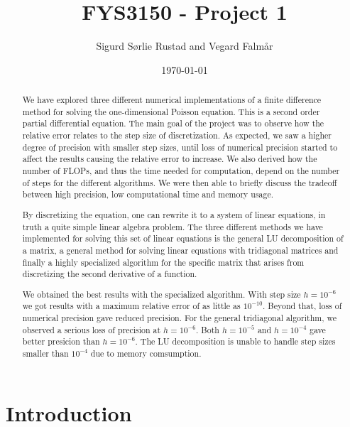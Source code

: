\documentclass[reprint, english,notitlepage]{revtex4-1}  %
\begin{document}
\title{FYS3150 - Project 1}
\date{\today}
\author{Sigurd Sørlie Rustad and Vegard Falmår}


\newpage

\begin{abstract}
We have explored three different numerical implementations of a finite difference method for solving the one-dimensional Poisson equation. This is a second order partial differential equation. The main goal of the project was to observe how the relative error relates to the step size of discretization. As expected, we saw a higher degree of precision with smaller step sizes, until loss of numerical precision started to affect the results causing the relative error to increase. We also derived how the number of FLOPs, and thus the time needed for computation, depend on the number of steps for the different algorithms. We were then able to briefly discuss the tradeoff between high precision, low computational time and memory usage.

By discretizing the equation, one can rewrite it to a system of linear equations, in truth a quite simple linear algebra problem. The three different methods we have implemented for solving this set of linear equations is the general LU decomposition of a matrix, a general method for solving linear equations with tridiagonal matrices and finally a highly specialized algorithm for the specific matrix that arises from discretizing the second derivative of a function.

We obtained the best results with the specialized algorithm. With step size $h = 10^{-6}$ we got results with a maximum relative error of as little as $10^{-10}$. Beyond that, loss of numerical precision gave reduced precision. For the general tridiagonal algorithm, we observed a serious loss of precision at $h = 10^{-6}$. Both $h = 10^{-5}$ and $h = 10^{-4}$ gave better presicion than $h = 10^{-6}$. The LU decomposition is unable to handle step sizes smaller than $10^{-4}$ due to memory comsumption.
\end{abstract}
\maketitle                                %


\section{Introduction}
\end{document}
